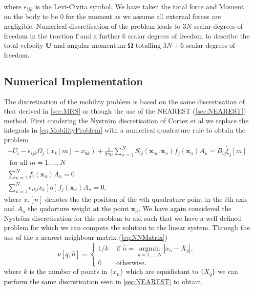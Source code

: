 where $\epsilon_{ijk}$ is the Levi-Civita symbol. We have taken the total force and Moment on the body to be $0$ for the moment as we assume all external forces are negligible. Numerical discretisation of the problem leads to $3N$ scalar degrees of freedom in the traction $\bm{f}$ and a further $6$ scalar degrees of freedom to describe the total velocity $\bm{U}$ and angular momentum $\bm{\Omega}$ totalling $3N+6$ scalar degrees of freedom.

\subsection{Numerical Implementation}
The discretisation of the mobility problem is based on the same discretisation of that derived in \cref{sec:MRS} or though the use of the NEAREST (\cref{sec:NEAREST}) method. First condering the Nyström discretisation of Cortez et al \cite{Cortez2005} we replace the integrals in \cref{eq:MobilityProblem} with a numerical quadrature rule to obtain the problem.
\begin{equation*}
\begin{gathered}
    -U_{i}-\epsilon_{i j k} \Omega_{j}\left(x_k[{m}]-x_{0 k}\right)+\frac{1}{8 \pi\mu} \sum_{n=1}^N S_{i j}^{\epsilon}(\bm{x}_m, \bm{x}_n) f_{j}(\bm{x}_n) A_n =  B_{i j} \dot{\xi}_{j}[m] \\ \text { for all } m = 1,\dots,N\\
    \sum_{n=1}^N f_{i}(\bm{x}_n) A_n=0 \\
    \sum_{n=1}^N \epsilon_{i k j} x_{k}[n] f_{j}(\bm{x}_n) A_n=0,
\end{gathered}
\end{equation*}
where $x_{i}[n]$ denotes the the position of the $n$th quadrature point in the $i$th axis and $A_n$ the qudarture weight at the point $\bm{x}_n$. We have again considered the Nyström discretisation for this problem to aid such that we have a well defined problem for which we can compute the solution to the linear system. Through the use of the a nearest neighbour matrix (\cref{eq:NNMatrix})
\begin{equation*}
    \nu [q, \hat{n}]= \begin{cases} 1/k & \text { if } \hat{n}=\underset{n=1, \ldots, N}{\operatorname{argmin}}|x_n-X_q| , \\ 0 & \text { otherwise. }\end{cases}
\end{equation*}
where $k$ is the number of points in $\{x_n\}$ which are equidistant to $\{X_q\}$ we can perform the same discretisation seen in \cref{sec:NEAREST} to obtain.
